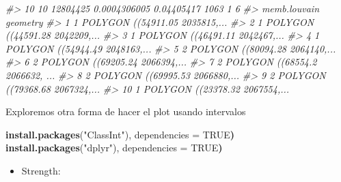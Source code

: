 \documentclass[
]{book}
\newenvironment{Shaded}{\begin{snugshade}}{\end{snugshade}}
\newcommand{\CommentTok}[1]{\textcolor[rgb]{0.56,0.35,0.01}{\textit{#1}}}
\newcommand{\ConstantTok}[1]{\textcolor[rgb]{0.56,0.35,0.01}{#1}}
\newcommand{\ErrorTok}[1]{\textcolor[rgb]{0.64,0.00,0.00}{\textbf{#1}}}
\newcommand{\FunctionTok}[1]{\textcolor[rgb]{0.13,0.29,0.53}{\textbf{#1}}}
\newcommand{\NormalTok}[1]{#1}
\newcommand{\OtherTok}[1]{\textcolor[rgb]{0.56,0.35,0.01}{#1}}
\newcommand{\StringTok}[1]{\textcolor[rgb]{0.31,0.60,0.02}{#1}}
\providecommand{\tightlist}{%
  \setlength{\itemsep}{0pt}\setlength{\parskip}{0pt}}
\begin{document}
\begin{Shaded}
\begin{Highlighting}[]
\CommentTok{\#\textgreater{} 10 10 12804425 0.0004306005 0.04405417 1063       1       6}
\CommentTok{\#\textgreater{}    memb.louvain                       geometry}
\CommentTok{\#\textgreater{} 1             1 POLYGON ((54911.05 2035815,...}
\CommentTok{\#\textgreater{} 2             1 POLYGON ((44591.28 2042209,...}
\CommentTok{\#\textgreater{} 3             1 POLYGON ((46491.11 2042467,...}
\CommentTok{\#\textgreater{} 4             1 POLYGON ((54944.49 2048163,...}
\CommentTok{\#\textgreater{} 5             2 POLYGON ((80094.28 2064140,...}
\CommentTok{\#\textgreater{} 6             2 POLYGON ((69205.24 2066394,...}
\CommentTok{\#\textgreater{} 7             2 POLYGON ((68554.2 2066632, ...}
\CommentTok{\#\textgreater{} 8             2 POLYGON ((69995.53 2066880,...}
\CommentTok{\#\textgreater{} 9             2 POLYGON ((79368.68 2067324,...}
\CommentTok{\#\textgreater{} 10            1 POLYGON ((23378.32 2067554,...}
\end{Highlighting}
\end{Shaded}

Exploremos otra forma de hacer el plot usando intervalos

\begin{Shaded}
\begin{Highlighting}[]
\FunctionTok{install.packages}\NormalTok{(}\StringTok{"ClassInt"}\NormalTok{), dependencies }\OtherTok{=} \ConstantTok{TRUE}\ErrorTok{)}
\FunctionTok{install.packages}\NormalTok{(}\StringTok{"dplyr"}\NormalTok{), dependencies }\OtherTok{=} \ConstantTok{TRUE}\ErrorTok{)}
\end{Highlighting}
\end{Shaded}

\begin{itemize}
\tightlist
\item
  Strength:
\end{itemize}
\end{document}
